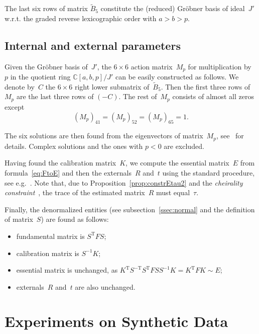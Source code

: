 \documentclass[reqno]{amsart}
\theoremstyle{plain}
\begin{document}
The last six rows of matrix $\tilde B_5$ constitute the (reduced) Gr\"{o}bner basis of ideal~$J'$ w.r.t. the graded reverse lexicographic order with $a > b > p$.


\subsection{Internal and external parameters}

Given the Gr\"{o}bner basis of~$J'$, the $6\times 6$ action matrix~$M_p$ for multiplication by~$p$ in the quotient ring $\mathbb C[a, b, p]/J'$ can be easily constructed as follows. We denote by~$C$ the $6\times 6$ right lower submatrix of~$\tilde B_5$. Then the first three rows of~$M_p$ are the last three rows of $(-C)$. The rest of~$M_p$ consists of almost all zeros except
\begin{equation}
(M_p)_{41} = (M_p)_{52} = (M_p)_{65} = 1.
\end{equation}

The six solutions are then found from the eigenvectors of matrix~$M_p$, see~\cite{CLS} for details. Complex solutions and the ones with $p < 0$ are excluded.

Having found the calibration matrix~$K$, we compute the essential matrix~$E$ from formula~\eqref{eq:FtoE} and then the externals~$R$ and~$t$ using the standard procedure, see e.g.~\cite{Nister}. Note that, due to Proposition~\ref{prop:constrEtau2} and the \emph{cheirality constraint}~\cite{HZ,Nister}, the trace of the estimated matrix~$R$ must equal~$\tau$.

Finally, the denormalized entities (see subsection~\ref{ssec:normal} and the definition of matrix~$S$) are found as follows:
\begin{itemize}
\item fundamental matrix is $S^{\mathrm T}FS$;
\item calibration matrix is $S^{-1}K$;
\item essential matrix is unchanged, as $K^{\mathrm T}S^{-\mathrm T}S^{\mathrm T}FSS^{-1}K = K^{\mathrm T}FK \sim E$;
\item externals~$R$ and~$t$ are also unchanged.
\end{itemize}



\section{Experiments on Synthetic Data}
\label{sec:synth}
\end{document}

